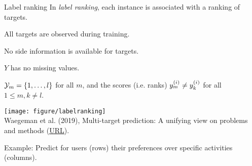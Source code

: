 \documentclass[11pt,compress,t,notes=noshow, xcolor=table]{beamer}
\begin{document}
\begin{frame}{Label ranking}
    In \emph{label ranking}, each instance is associated with a ranking of targets. 

		\begin{itemize}
			
			\begin{minipage}{0.45\textwidth}    
                \item All targets are observed during training. 

    			\item No side information is available for targets. 		
                
    			\item $Y$ has no missing values. 
                
    			\item $\mathcal{Y}_m = \{1, \ldots , l\}$ for all $m$, and the scores (i.e. ranks) $y^{(i)}_m \neq y_{k}^{(i)}$ for all $1 \leq m,k \neq l$. 
			\end{minipage}
            \hfill
			\begin{minipage}{0.45\textwidth}    
    			\begin{center}
                    \texttt{[image: figure/labelranking]} \tiny
    				\\ Waegeman et al. (2019), Multi-target prediction:
    				A unifying view on problems and methods (\href{https://arxiv.org/pdf/1809.02352.pdf}{\underline{URL}}).
     	
    			\end{center}
	        \end{minipage}
		\end{itemize}
  
	Example: Predict for users (rows) their preferences over specific activities (columns).
	
\end{frame}
\end{document}
